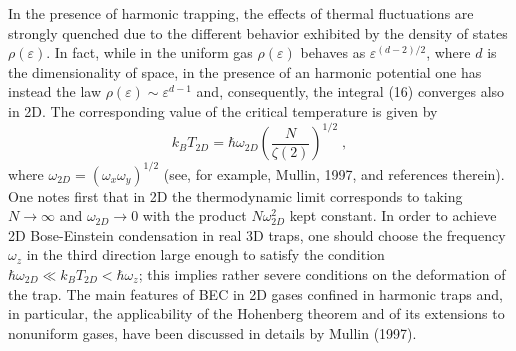 In the presence of harmonic trapping, the effects of thermal
fluctuations are  strongly quenched due to the different behavior
exhibited by  the density of states $\rho(\varepsilon)$.
In fact, while in the uniform gas $\rho(\varepsilon)$ behaves as
$ \varepsilon^{(d-2)/2}$, where $d$ is the dimensionality of
space, in the presence of an harmonic potential one has instead the law
$\rho(\varepsilon) \sim \varepsilon^{d-1}$ and, consequently, the
integral (16) converges also in 2D. The corresponding value of the
critical temperature is given by
\begin{equation}
k_B T_{2D}= \hbar\omega_{2D} \left(\frac{N}{\zeta(2)}\right)^{1/2} \; ,
\label{eq:t2d}
\end{equation}
where $\omega_{2D}=(\omega_x\omega_y)^{1/2}$ (see, for example, Mullin, 
1997, and references therein).  One notes first that in 2D the 
thermodynamic limit corresponds to taking $N \to \infty$
and $\omega_{2D}\to 0$ with the product $N\omega_{2D}^2$ kept constant.
In order to achieve 2D Bose-Einstein condensation in real 3D traps, one 
should choose the frequency $\omega_z$ in the third direction large 
enough to satisfy the condition  $\hbar\omega_{2D}\ll k_BT_{2D} < 
\hbar \omega_z$; this implies rather severe conditions on the deformation 
of the trap. The main features of BEC in 2D gases confined in harmonic 
traps and, in particular, the applicability of the Hohenberg theorem and
of its extensions to nonuniform gases, have been discussed in details
by Mullin (1997).  

